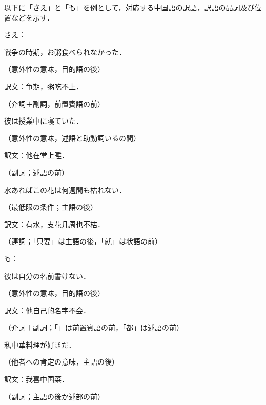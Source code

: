 以下に「さえ」と「も」を例として，対応する中国語の訳語，訳語の品詞及び位置などを示す．

\vspace{1em}
\noindent
さえ：
\begin{enumerates}
 \setcounter{enumi}{9}
 \item 戦争の時期，お粥食べられなかった．
       \begin{flushright}
	（意外性の意味，目的語の後）
       \end{flushright}
       訳文：争期，粥吃不上．
       \begin{flushright}
	（介詞＋副詞，前置賓語の前）
       \end{flushright}
 \item 彼は授業中に寝ていた．
       \begin{flushright}
	（意外性の意味，述語と助動詞いるの間）
       \end{flushright}
       訳文：他在堂上睡．
       \begin{flushright}
	（副詞；述語の前）
       \end{flushright}
 \item 水あればこの花は何週間も枯れない．
       \begin{flushright}
	（最低限の条件；主語の後）
       \end{flushright}
       訳文：有水，支花几周也不枯．
       \begin{flushright}
	（連詞；「只要」は主語の後，「就」は状語の前）
       \end{flushright}
\end{enumerates}

\vspace{1em}
\noindent
も：
\begin{enumerates}
 \setcounter{enumi}{12}
 \item 彼は自分の名前書けない．
       \begin{flushright}
	（意外性の意味，目的語の後）
       \end{flushright}
       訳文：他自己的名字不会．
       \begin{flushright}
	（介詞＋副詞；「」は前置賓語の前，「都」は述語の前）
       \end{flushright}
\newpage
 \item 私中華料理が好きだ．
       \begin{flushright}
	（他者への肯定の意味，主語の後）
       \end{flushright}
       訳文：我喜中国菜．
       \begin{flushright}
	（副詞；主語の後か述部の前）
       \end{flushright}
\end{enumerates}

